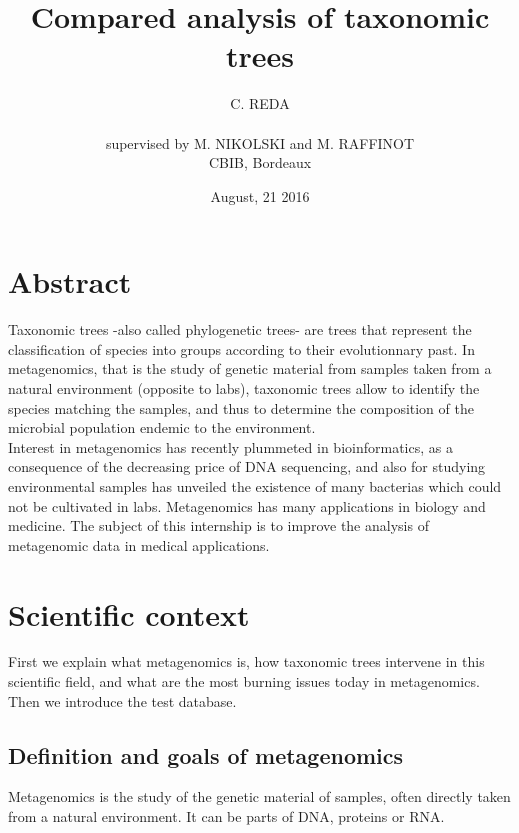 \documentclass{report}
\title{Compared analysis of taxonomic trees}
\author{C. REDA \\ \\ supervised by M. NIKOLSKI and M. RAFFINOT\\CBIB, Bordeaux}
\date{August, 21 2016}
\begin{document}
\maketitle

\chapter*{Abstract}
\nocite{*}
Taxonomic trees -also called phylogenetic trees- are trees that represent the classification of species into groups according to their evolutionnary past. In metagenomics, that is the study of genetic material from samples taken from a natural environment (opposite to labs), taxonomic trees allow to identify the species matching the samples, and thus to determine the composition of the microbial population endemic to the environment.\\

Interest in metagenomics has recently plummeted in bioinformatics, as a consequence of the decreasing price of DNA sequencing, and also for studying environmental samples has unveiled the existence of many bacterias which could not be cultivated in labs. Metagenomics has many applications in biology and medicine. The subject of this internship is to improve the analysis of metagenomic data in medical applications.\\

\newpage
 
\tableofcontents
 
\newpage

\listoffigures

\newpage

\listoftables

\newpage
 

\chapter{Scientific context}

First we explain what metagenomics is, how taxonomic trees intervene in this scientific field, and what are the most burning issues today in metagenomics. Then we introduce the test database.

\section{Definition and goals of metagenomics}
Metagenomics is the study of the genetic material of samples, often directly taken from a natural environment. It can be parts of DNA, proteins or RNA.\\
\end{document}
